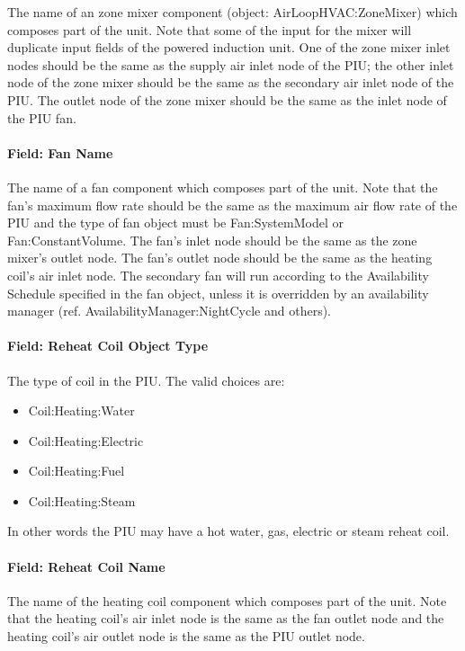 The name of an zone mixer component (object: AirLoopHVAC:ZoneMixer) which composes part of the unit. Note that some of the input for the mixer will duplicate input fields of the powered induction unit. One of the zone mixer inlet nodes should be the same as the supply air inlet node of the PIU; the other inlet node of the zone mixer should be the same as the secondary air inlet node of the PIU. The outlet node of the zone mixer should be the same as the inlet node of the PIU fan.

\paragraph{Field: Fan Name}\label{field-fan-name-1}

The name of a fan component which composes part of the unit. Note that the fan's maximum flow rate should be the same as the maximum air flow rate of the PIU and the type of fan object must be Fan:SystemModel or Fan:ConstantVolume. The fan's inlet node should be the same as the zone mixer's outlet node. The fan's outlet node should be the same as the heating coil's air inlet node. The secondary fan will run according to the Availability Schedule specified in the fan object, unless it is overridden by an availability manager (ref. AvailabilityManager:NightCycle and others).

\paragraph{Field: Reheat Coil Object Type}\label{field-reheat-coil-object-type-3}

The type of coil in the PIU. The valid choices are:

\begin{itemize}
\item
  Coil:Heating:Water
\item
  Coil:Heating:Electric
\item
  Coil:Heating:Fuel
\item
  Coil:Heating:Steam
\end{itemize}

In other words the PIU may have a hot water, gas, electric or steam reheat coil.

\paragraph{Field: Reheat Coil Name}\label{field-reheat-coil-name-3}

The name of the heating coil component which composes part of the unit. Note that the heating coil's air inlet node is the same as the fan outlet node and the heating coil's air outlet node is the same as the PIU outlet node.

